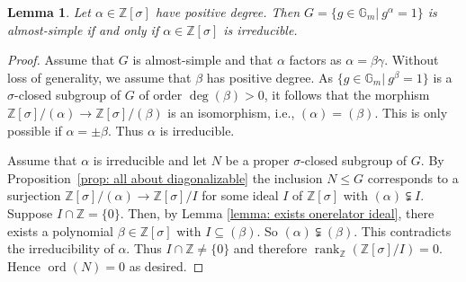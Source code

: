 \documentclass[oneside,reqno]{amsart}
\newtheorem{lemma}[theo]{Lemma}
\theoremstyle{definition}
\newcommand{\G}{\mathcal{G}}
\newcommand{\ord}{\operatorname{ord}}
\newcommand{\s}{\sigma}
\newcommand{\Gm}{\mathbb{G}_m}
\newcommand{\ZZ}{\mathbb{Z}}
\newcommand{\rank}{\operatorname{rank}}
\begin{document}
\begin{lemma} \label{lemma: ex of onerelator subgroup}
	Let $\alpha\in \ZZ[\s]$ have positive degree. Then $G=\{g\in \Gm|\ g^\alpha=1\}$ is almost-simple if and only if $\alpha\in \ZZ[\s]$ is irreducible.
\end{lemma}
\begin{proof}
	Assume that $G$ is almost-simple and that $\alpha$ factors as $\alpha=\beta\gamma$. Without loss of generality, we assume that $\beta$ has positive degree. As $\{g\in\Gm|\ g^\beta=1\}$ is a $\s$-closed subgroup of $G$ of order $\deg(\beta)>0$, it follows that the morphism $\ZZ[\s]/(\alpha)\to \ZZ[\s]/(\beta)$ is an isomorphism, i.e., $(\alpha)=(\beta)$. This is only possible if $\alpha=\pm\beta$. Thus $\alpha$ is irreducible.
	
	Assume that $\alpha$ is irreducible and let $N$ be a proper $\s$-closed subgroup of $G$. By Proposition~\ref{prop: all about diagonalizable} the inclusion $N\leq G$ corresponds to a surjection $\ZZ[\s]/(\alpha)\to \ZZ[\s]/I$ for some ideal $I$ of $\ZZ[\s]$ with $(\alpha)\subsetneqq I$. Suppose $I\cap\ZZ=\{0\}$. Then, by Lemma \ref{lemma: exists onerelator ideal}, there exists a polynomial $\beta\in \ZZ[\s]$ with $I\subseteq (\beta)$. So $(\alpha)\subsetneqq(\beta)$. This contradicts the irreducibility of $\alpha$. Thus $I\cap\ZZ\neq\{0\}$ and therefore $\rank_{\ZZ}(\ZZ[\s]/I)=0$. Hence $\ord(N)=0$ as desired. %
\end{proof}	


%

%
\end{document}
